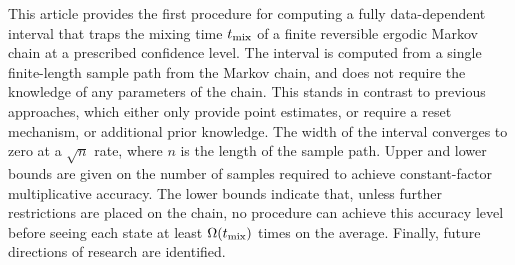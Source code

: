 This article provides the first procedure for computing a fully data-dependent interval that traps the mixing time $t_{\operatorname{mix}}$ of a finite reversible ergodic Markov chain at a prescribed confidence level.  The interval is computed from a single finite-length sample path from the Markov chain, and does not require the knowledge of any parameters of the chain.  This stands in contrast to previous approaches, which either only provide point estimates, or require a reset mechanism, or additional prior knowledge.  The width of the interval converges to zero at a $\sqrt{n}$ rate, where $n$ is the length of the sample path.  Upper and lower bounds are given on the number of samples required to achieve constant-factor multiplicative accuracy.  The lower bounds indicate that, unless further restrictions are placed on the chain, no procedure can achieve this accuracy level before seeing each state at least $\Omega(t_{\operatorname{mix}})$ times on the average.  Finally, future directions of research are identified.

